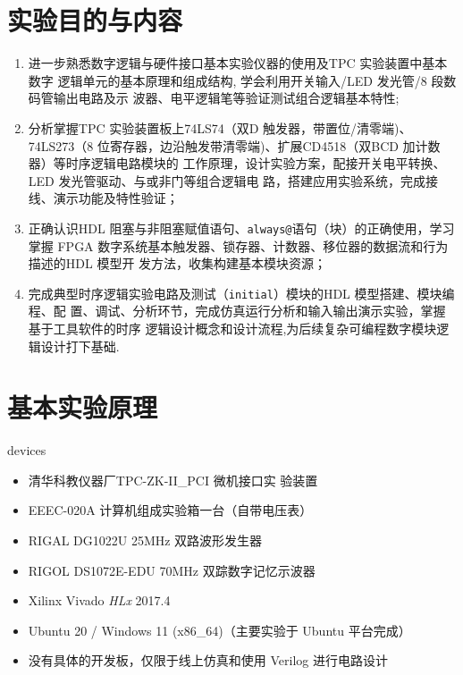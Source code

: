 \documentclass[11pt]{SEU-Digital-Report}
\begin{document}
  \exptitlepage

  \tableofcontents
  \newpage

  \section{实验目的与内容}

        
    \begin{enumerate}
        \item 进一步熟悉数字逻辑与硬件接口基本实验仪器的使用及TPC 实验装置中基本数字
        逻辑单元的基本原理和组成结构, 学会利用开关输入/LED 发光管/8 段数码管输出电路及示
        波器、电平逻辑笔等验证测试组合逻辑基本特性;
        \item 分析掌握TPC 实验装置板上74LS74（双D 触发器，带置位/清零端)、74LS273（8
        位寄存器，边沿触发带清零端)、扩展CD4518（双BCD 加计数器）等时序逻辑电路模块的
        工作原理，设计实验方案，配接开关电平转换、LED 发光管驱动、与或非门等组合逻辑电
        路，搭建应用实验系统，完成接线、演示功能及特性验证；
        \item 正确认识HDL 阻塞与非阻塞赋值语句、\texttt{always@}语句（块）的正确使用，学习掌握
        FPGA 数字系统基本触发器、锁存器、计数器、移位器的数据流和行为描述的HDL 模型开
        发方法，收集构建基本模块资源；
        \item 完成典型时序逻辑实验电路及测试（\texttt{initial}）模块的HDL 模型搭建、模块编程、配
        置、调试、分析环节，完成仿真运行分析和输入输出演示实验，掌握基于工具软件的时序
        逻辑设计概念和设计流程,为后续复杂可编程数字模块逻辑设计打下基础. 
    \end{enumerate}

    \section{基本实验原理}

      \begin{device}{}{devices}
        \begin{itemize}
          \item 清华科教仪器厂TPC-ZK-II\_PCI 微机接口实
          验装置
          \item EEEC-020A 计算机组成实验箱一台（自带电压表）
          \item RIGAL DG1022U 25MHz 双路波形发生器
          \item RIGOL DS1072E-EDU 70MHz 双踪数字记忆示波器
          \item Xilinx Vivado \textit{HLx} 2017.4
          \item Ubuntu 20 / Windows 11 (x86\_64){\kaishu\color{gray}（主要实验于 Ubuntu 平台完成）}
          \item 没有具体的开发板，仅限于线上仿真和使用 Verilog 进行电路设计
        \end{itemize}
      \end{device}
\end{document}
